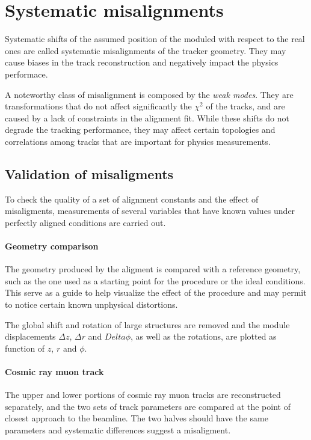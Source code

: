 \section{Systematic misalignments}
Systematic shifts of the assumed position of the moduled with respect to the real ones
are called systematic misalignments of the tracker geometry. They
may cause biases in the track reconstruction and negatively impact the physics performace.

A noteworthy class of misalignment is composed by the \textit{weak modes}.
They are transformations that do not affect significantly the $\chi^2$ of the tracks,
and are caused by a lack of constraints in the alignment fit.
While these shifts do not degrade the tracking performance,
they may affect certain topologies and correlations among tracks that are important for physics measurements.

\subsection{Validation of misaligments}
To check the quality of a set of alignment constants and the effect of misaligments,
measurements of several variables that have known values under perfectly aligned conditions are carried out.

\paragraph{Geometry comparison\\}
The geometry produced by the aligment is compared with a reference geometry,
such as the one used as a starting point for the procedure or the ideal conditions.
This serve as a guide to help visualize the effect of the procedure
and may permit to notice certain known unphysical distortions.

The global shift and rotation of large structures are removed and the module displacements
$\Delta z$, $\Delta r$ and $Delta \phi$, as well as the rotations,
are plotted as function of $z$, $r$ and $\phi$.

\paragraph{Cosmic ray muon track\\} %
The upper and lower portions of cosmic ray muon tracks are reconstructed separately,
and the two sets of track parameters are compared at the point of closest approach to the beamline.
The two halves should have the same parameters and systematic differences suggest a misaligment.


